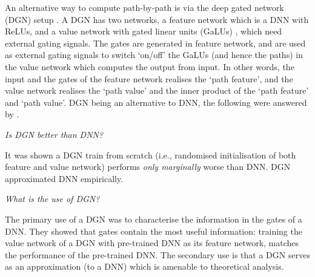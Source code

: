 An alternative way to compute path-by-path  is via the deep gated network (DGN) setup \citep{npk}. A DGN has two networks, a feature network which is a DNN with ReLUs, and a value network with gated linear units (GaLUs) \citep{sss}, which need external gating signals. The gates are generated in feature network, and are used as external gating signals to switch `on/off' the GaLUs (and hence the paths) in the value network  which computes the output from input. In other words, the input and the gates of the feature network realises the `path feature', and the value network realises the `path value' and the inner product of the `path feature' and `path value'. DGN being an alternative to DNN, the following were answered by \cite{npk}.

\emph{Is DGN better than DNN?}

It was shown a DGN train from scratch (i.e., randomised initialisation of both feature and value network) performs \emph{only marginally} worse than DNN. DGN approximated DNN empirically.

\emph{What is the use of DGN?}

The primary use of a DGN was to characterise the information in the gates of a DNN. They showed that gates contain the most useful information: training the value network of a DGN with pre-trained DNN as its feature network, matches the performance of the pre-trained DNN. The secondary use is that a DGN serves as an approximation (to a DNN) which is amenable to theoretical analysis.  %





 


